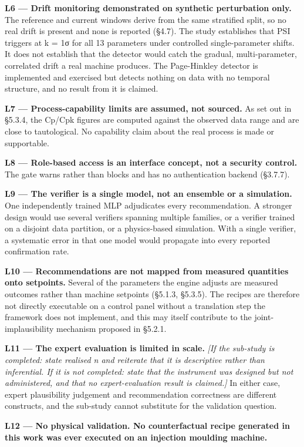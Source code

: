 \textbf{L6 --- Drift monitoring demonstrated on synthetic perturbation only.} The reference and current windows derive from the same stratified split, so no real drift is present and none is reported (§4.7). The study establishes that PSI triggers at k = 1σ for all 13 parameters under controlled single-parameter shifts. It does not establish that the detector would catch the gradual, multi-parameter, correlated drift a real machine produces. The Page-Hinkley detector is implemented and exercised but detects nothing on data with no temporal structure, and no result from it is claimed.

\textbf{L7 --- Process-capability limits are assumed, not sourced.} As set out in §5.3.4, the Cp/Cpk figures are computed against the observed data range and are close to tautological. No capability claim about the real process is made or supportable.

\textbf{L8 --- Role-based access is an interface concept, not a security control.} The gate warns rather than blocks and has no authentication backend (§3.7.7).

\textbf{L9 --- The verifier is a single model, not an ensemble or a simulation.} One independently trained MLP adjudicates every recommendation. A stronger design would use several verifiers spanning multiple families, or a verifier trained on a disjoint data partition, or a physics-based simulation. With a single verifier, a systematic error in that one model would propagate into every reported confirmation rate.

\textbf{L10 --- Recommendations are not mapped from measured quantities onto setpoints.} Several of the parameters the engine adjusts are measured outcomes rather than machine setpoints (§5.1.3, §5.3.5). The recipes are therefore not directly executable on a control panel without a translation step the framework does not implement, and this may itself contribute to the joint-implausibility mechanism proposed in §5.2.1.

\textbf{L11 --- The expert evaluation is limited in scale.} \emph{{[}If the sub-study is completed: state realised n and reiterate that it is descriptive rather than inferential. If it is not completed: state that the instrument was designed but not administered, and that no expert-evaluation result is claimed.{]}} In either case, expert plausibility judgement and recommendation correctness are different constructs, and the sub-study cannot substitute for the validation question.

\textbf{L12 --- No physical validation. No counterfactual recipe generated in this work was ever executed on an injection moulding machine.}


